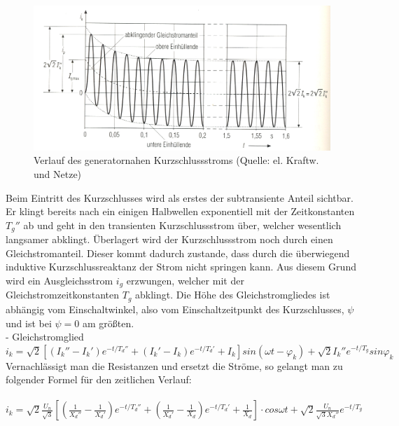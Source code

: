 \documentclass{scrartcl}
\begin{document}
\begin{onehalfspace}
	\begin{figure}[H]
	\centering
	\includegraphics[scale=1]{img/kurzschlussstromverlauf-nah.jpg}
	\caption{Verlauf des generatornahen Kurzschlussstroms (Quelle: el. Kraftw. und Netze)}
	\label{kss-verlauf}
	\end{figure}

Beim Eintritt des Kurzschlusses wird als erstes der subtransiente Anteil sichtbar. Er klingt bereits nach ein einigen Halbwellen exponentiell mit der Zeitkonstanten $T_g''$ ab und geht in den transienten Kurzschlussstrom über, welcher wesentlich langsamer abklingt. Überlagert wird der Kurzschlussstrom noch durch einen Gleichstromanteil. Dieser kommt dadurch zustande, dass durch die überwiegend induktive Kurzschlussreaktanz der Strom nicht \glqq springen\grqq{} kann. Aus diesem Grund wird ein Ausgleichsstrom $i_g$ erzwungen, welcher mit der Gleichstromzeitkonstanten $T_g$ abklingt. Die Höhe des Gleichstromgliedes ist abhängig vom Einschaltwinkel, also vom Einschaltzeitpunkt des Kurzschlusses, $\psi$ und ist bei $\psi = 0$ am größten.
\\- Gleichstromglied \\

$i_k = \sqrt{2} [(I_k'' - I_k') e^{-t/T_d''} + (I_k' - I_k) e^{-t/T_d'} + I_k]sin(\omega t - \varphi_k) + \sqrt{2} I_k'' e^{-t/T_g} sin \varphi_k $ \\

Vernachlässigt man die Resistanzen und ersetzt die Ströme, so gelangt man zu folgender Formel für den zeitlichen Verlauf: \\ \\
$i_k = \sqrt{2} \frac{U_n}{\sqrt{3}} [(\frac{1}{X_d''} - \frac{1}{X_d'}) e^{-t/T_d''} + (\frac{1}{X_d'} - \frac{1}{X_d}) e^{-t/T_d'} + \frac{1}{X_d}] \cdot cos\omega t + \sqrt{2} \frac{U_n}{\sqrt{3} X_d''} e^{-t/T_g}$


\end{onehalfspace}
\end{document}

